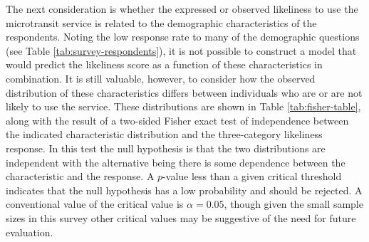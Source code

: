 \documentclass[smartcities,article,submit,moreauthors,pdftex]{mdpi}
\begin{document}
The next consideration is whether the expressed or observed likeliness to use
the microtransit service is related to the demographic characteristics of the
respondents. Noting the low response rate to many of the demographic questions
(see Table \ref{tab:survey-respondents}), it is not possible to construct a model
that would predict the likeliness score as a function of these characteristics
in combination. It is still valuable, however, to consider how the observed
distribution of these characteristics differs between individuals who are or are
not likely to use the service. These distributions are shown in Table
\ref{tab:fisher-table}, along with the result of a two-sided Fisher exact test of
independence between the indicated characteristic distribution and the
three-category likeliness response. In this test the null hypothesis is that the
two distributions are independent with the alternative being there is some
dependence between the characteristic and the response. A \(p\)-value less than a
given critical threshold indicates that the null hypothesis has a low
probability and should be rejected. A conventional value of the critical value
is \(\alpha=0.05\), though given the small sample sizes in this survey other
critical values may be suggestive of the need for future evaluation.
\end{document}
